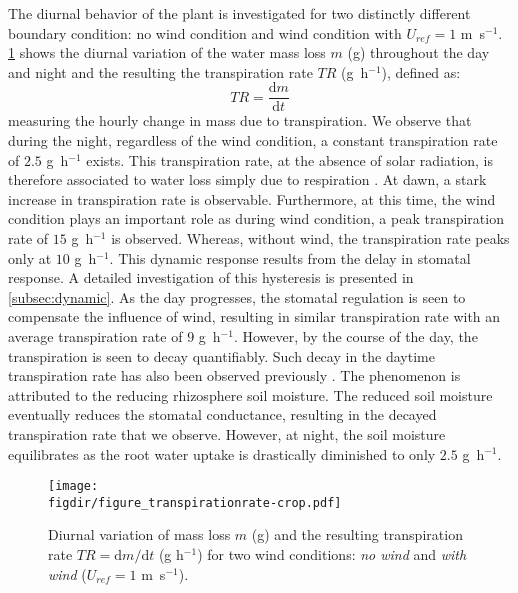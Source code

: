 The diurnal behavior of the plant is investigated for two distinctly different boundary condition: no wind condition and wind condition with $U_{ref}=1$ m~s$^{-1}$. \cref{fig:figure_transpirationrate} shows the diurnal variation of the water mass loss $m$ (g) throughout the day and night and the resulting the transpiration rate $TR$ (g~h$^{-1}$), defined as:
\begin{equation}
TR = \frac{\mathrm{d}m}{\mathrm{d}t}
\end{equation}
measuring the hourly change in mass due to transpiration. We observe that during the night, regardless of the wind condition, a constant transpiration rate of $2.5$ g~h$^{-1}$ exists. This transpiration rate, at the absence of solar radiation, is therefore associated to water loss simply due to respiration \citep{Farquhar1980, Lambers2008, Launiainen2015}. At dawn, a stark increase in transpiration rate is observable. Furthermore, at this time, the wind condition plays an important role as during wind condition, a peak transpiration rate of $15$ g~h$^{-1}$ is observed. Whereas, without wind, the transpiration rate peaks only at $10$ g~h$^{-1}$. This dynamic response results from the delay in stomatal response. A detailed investigation of this hysteresis is presented in \cref{subsec:dynamic}. As the day progresses, the stomatal regulation is seen to compensate the influence of wind, resulting in similar transpiration rate with an average transpiration rate of $9$ g~h$^{-1}$. However, by the course of the day, the transpiration is seen to decay quantifiably. Such decay in the daytime transpiration rate has also been observed previously \citep{Javaux2013, Tuzet2003}. The phenomenon is attributed to the reducing rhizosphere soil moisture. The reduced soil moisture eventually reduces the stomatal conductance, resulting in the decayed transpiration rate that we observe. However, at night, the soil moisture equilibrates as the root water uptake is drastically diminished to only $2.5$ g~h$^{-1}$. 

	\begin{figure}[t]
	\centering
	\texttt{[image: \\figdir/figure\_transpirationrate-crop.pdf]}
	\caption{Diurnal variation of mass loss $m$ (g) and the resulting transpiration rate $TR=\mathrm{d}m/\mathrm{d}t$ (g h$^{-1}$) for two wind conditions: \textit{no wind} and \textit{with wind} ($U_{ref}=1$ m~s$^{-1}$).}
	\label{fig:figure_transpirationrate}
	\end{figure}

